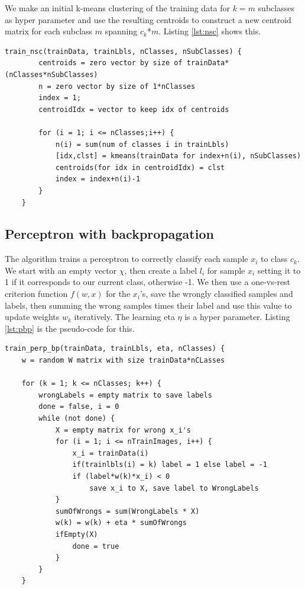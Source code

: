 \documentclass[journal]{IEEEtran}
\begin{document}
We make an initial k-means clustering of the training data for $k=m$ subclasses as hyper parameter and use the resulting centroids to construct a new centroid matrix for each subclass $m$ spanning $c_{k}$*$m$. Listing \ref{lst:nsc} shows this.

\begin{minipage}[H]{0.95\linewidth}
	\begin{lstlisting}[caption=Implementation of NSC., label={lst:nsc}]
	train_nsc(trainData, trainLbls, nClasses, nSubClasses) {
		centroids = zero vector by size of trainData*(nClasses*nSubClasses)
		n = zero vector by size of 1*nClasses
		index = 1;
		centroidIdx = vector to keep idx of centroids
	
		for (i = 1; i <= nClasses;i++) {
			n(i) = sum(num of classes i in trainLbls)
			[idx,clst] = kmeans(trainData for index+n(i), nSubClasses)
			centroids(for idx in centroidIdx) = clst
			index = index+n(i)-1
		}
	}
	\end{lstlisting}
\end{minipage}

\subsection{Perceptron with backpropagation} 

The algorithm trains a perceptron to correctly classify each sample $x_{i}$ to class $c_{k}$. We start with an empty vector $\chi$, then create a label $l_{i}$ for sample $x_{i}$ setting it to 1 if it corresponds to our current class, otherwise -1. We then use a one-vs-rest criterion function $f(w,x)$ for the $x_{i}$'s, save the wrongly classified samples and labels, then summing the wrong samples times their label and use this value to update weights $w_{k}$ iteratively. The learning eta $\eta$ is a hyper parameter. Listing \ref{lst:pbp} is the pseudo-code for this.

\begin{minipage}[H]{0.95\linewidth}
	\begin{lstlisting}[caption=Implementation of NSC., label={lst:pbp}]
	train_perp_bp(trainData, trainLbls, eta, nClasses) {
	w = random W matrix with size trainData*nCLasses
	
	for (k = 1; k <= nClasses; k++) {
		wrongLabels = empty matrix to save labels
		done = false, i = 0
		while (not done) {
			X = empty matrix for wrong x_i's
			for (i = 1; i <= nTrainImages, i++) {
				x_i = trainData(i)
				if(trainlbls(i) = k) label = 1 else label = -1
				if (label*w(k)*x_i) < 0
					save x_i to X, save label to WrongLabels
			}
			sumOfWrongs = sum(WrongLabels * X)
			w(k) = w(k) + eta * sumOfWrongs
			ifEmpty(X)
				done = true
			}
		}
	}
	\end{lstlisting}
\end{minipage}
\end{document}
